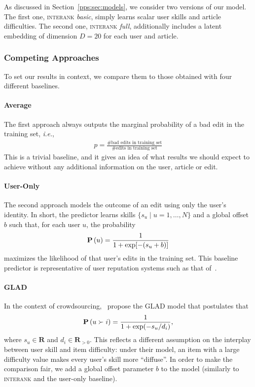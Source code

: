 As discussed in Section~\ref{pps:sec:models}, we consider two versions of our model.
The first one, \textsc{interank} \emph{basic}, simply learns scalar user skills and article difficulties.
The second one, \textsc{interank} \emph{full}, additionally includes a latent embedding of dimension $D = 20$ for each user and article.

\subsubsection{Competing Approaches}
\label{pps:sec:wikicompeting}
To set our results in context, we compare them to those obtained with four different baselines.

\paragraph{Average}
The first approach always outputs the marginal probability of a bad edit in the training set, \textit{i.e.},
\begin{align*}
	p = \frac{\text{\# bad edits in training set}}{\text{\# edits in training set}}
\end{align*}
This is a trivial baseline, and it gives an idea of what results we should expect to achieve without any additional information on the user, article or edit.

\paragraph{User-Only}
The second approach models the outcome of an edit using only the user's identity.
In short, the predictor learns skills $\{s_u \mid u = 1, \ldots, N\}$ and a global offset $b$ such that, for each user $u$, the probability
\begin{align*}
	\mathbf{P}\left( u \right) = \frac{1}{1 + \exp[- (s_u + b)]}
\end{align*}
maximizes the likelihood of that user's edits in the training set.
This baseline predictor is representative of user reputation systems such as that of~\citet{adler2007content}.

\paragraph{GLAD}
In the context of crowdsourcing,~\citet{whitehill2009whose} propose the GLAD model that postulates that
\begin{align*}
	\mathbf{P}\left( u \succ i \right) = \frac{1}{1 + \exp(- s_u / d_i)},
\end{align*}
where $s_u \in \mathbf{R}$ and $d_i \in \mathbf{R}_{>0}$.
This reflects a different assumption on the interplay between user skill and item difficulty: under their model, an item with a large difficulty value makes every user's skill more ``diffuse''.
In order to make the comparison fair, we add a global offset parameter $b$ to the model (similarly to \textsc{interank} and the user-only baseline).

